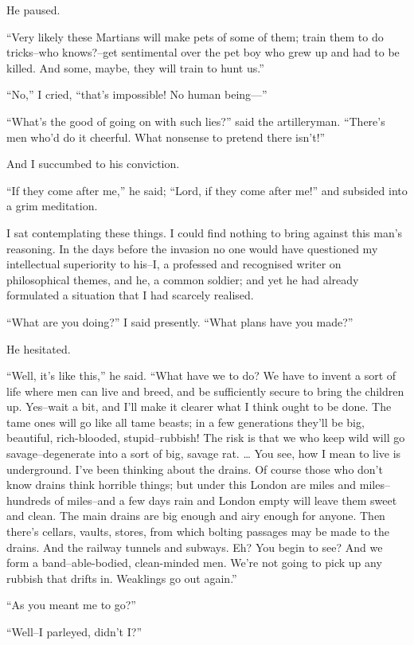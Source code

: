 He paused.

``Very likely these Martians will make pets of some of them; train
them to do tricks--who knows?--get sentimental over the pet boy who
grew up and had to be killed. And some, maybe, they will train to
hunt us.''

``No,'' I cried, ``that's impossible! No human being---''

``What's the good of going on with such lies?'' said the
artilleryman. ``There's men who'd do it cheerful. What nonsense to
pretend there isn't!''

And I succumbed to his conviction.

``If they come after me,'' he said; ``Lord, if they come after me!''
and subsided into a grim meditation.

I sat contemplating these things. I could find nothing to bring
against this man's reasoning. In the days before the invasion no
one would have questioned my intellectual superiority to his--I, a
professed and recognised writer on philosophical themes, and he, a
common soldier; and yet he had already formulated a situation that
I had scarcely realised.

``What are you doing?'' I said presently. ``What plans have you
made?''

He hesitated.

``Well, it's like this,'' he said. ``What have we to do? We have to
invent a sort of life where men can live and breed, and be
sufficiently secure to bring the children up. Yes--wait a bit, and
I'll make it clearer what I think ought to be done. The tame ones
will go like all tame beasts; in a few generations they'll be big,
beautiful, rich-blooded, stupid--rubbish! The risk is that we who
keep wild will go savage--degenerate into a sort of big, savage
rat. \ldots{} You see, how I mean to live is underground. I've been
thinking about the drains. Of course those who don't know drains
think horrible things; but under this London are miles and
miles--hundreds of miles--and a few days rain and London empty will
leave them sweet and clean. The main drains are big enough and airy
enough for anyone. Then there's cellars, vaults, stores, from which
bolting passages may be made to the drains. And the railway tunnels
and subways. Eh? You begin to see? And we form a band--able-bodied,
clean-minded men. We're not going to pick up any rubbish that
drifts in. Weaklings go out again.''

``As you meant me to go?''

``Well--I parleyed, didn't I?''


